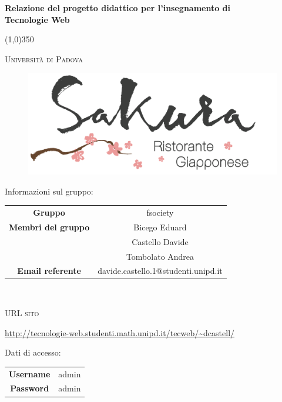 \documentclass{article}
\author{Bicego Eduard, Castello Davide, Tombolato Andrea}
\date{01/02/2016}
\begin{document}
	\begin{titlepage}
		\centering
	{\huge\bfseries Relazione del progetto didattico per l'insegnamento di \\Tecnologie Web \par}

	\line(1,0){350} \\
	{\scshape\LARGE Università di Padova \par}
	\vspace{0.5cm}
	\hypersetup{
		colorlinks=true,
		linkcolor=blue,
		anchorcolor=black,
		citecolor=black,
		urlcolor=blue,
	}
	\begin{figure}[H]
	\centering
		\includegraphics[width=\textwidth]{images/logo}
	\end{figure}
	{\LARGE Informazioni sul gruppo:\par}
	\vspace{0.3cm}
	\begin{tabular}{c|c} 
		{\hfill\textbf{Gruppo}} 			&  fsociety  \\ 
		{\hfill\textbf{Membri del gruppo}} 			&  Bicego Eduard \\ 
										& Castello Davide \\
										& Tombolato Andrea \\
		{\hfill\textbf{Email referente}} 		& davide.castello.1@studenti.unipd.it \\
	\end{tabular}\\
	\vspace{1cm}
	{\scshape\LARGE URL sito \par}
	\vspace{0.2cm}
	\large \url{http://tecnologie-web.studenti.math.unipd.it/tecweb/~dcastell/} \par
	\vspace{0.5cm}
	{\LARGE Dati di accesso:\par}
	\vspace{0.3cm}
	\begin{tabular}{c|c} 
		{\hfill\textbf{Username}} 			&  admin  \\ 
		{\hfill\textbf{Password}} 		& admin  	\\
	\end{tabular}\\
	\end{titlepage}
\newpage
	\pagestyle{myfrontrel}
	\tableofcontents
\newpage
	\listoffigures
	\label{LastFrontPage}
\newpage
	\pagestyle{myrel}
	
\newpage
	
\newpage
	
\newpage
	
\newpage
	
\newpage
	
\newpage
	
\label{LastPage}
\end{document}
